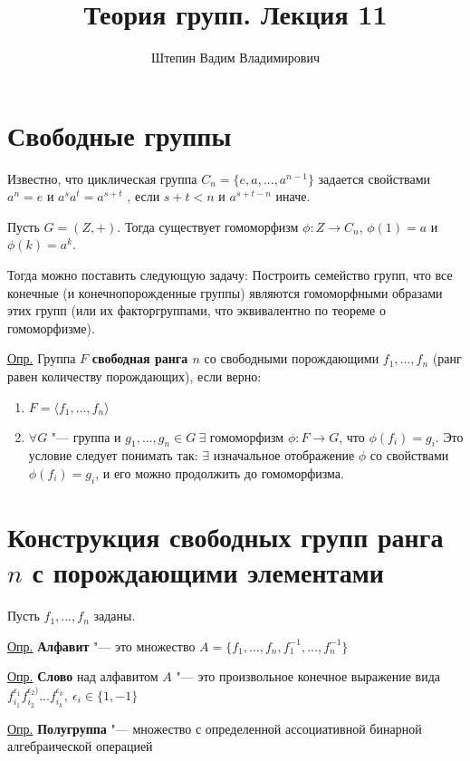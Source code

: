 \documentclass{article}
\title{Теория групп. Лекция 11}
\author{Штепин Вадим Владимирович}
\date{\DTMdate{2019-11-14}}
\begin{document}
\maketitle

\section{Свободные группы}

Известно, что циклическая группа $C_n = \{e, a, ..., a^{n-1}\}$ задается свойствами $a^n = e$ и $a^sa^t = a^{s + t}$ , если $s + t < n$ и $a^{s + t - n}$ иначе.

Пусть $G = (Z, +)$. Тогда существует гомоморфизм $\phi: Z \rightarrow C_n$, $\phi(1) = a$ и $\phi(k) = a^k$.

Тогда можно поставить следующую задачу: Построить семейство групп, что все конечные (и конечнопорожденные группы) являются гомоморфными образами этих групп (или их факторгруппами, что эквивалентно по теореме о гомоморфизме).

\vspace{10pt}

\underline{Опр.} Группа $F$ \textbf{свободная ранга $n$} со свободными порождающими $f_1, ..., f_n$ (ранг равен количеству порождающих), если верно:
\begin{enumerate}
	\item $F = \langle f_1, ..., f_n \rangle$
	\item $\forall G$ "--- группа и $g_1, ..., g_n \in G \  \exists$ гомоморфизм $\phi: F \rightarrow G$, что $\phi(f_i) = g_i$. Это условие следует понимать так: $\exists$ изначальное отображение $\phi$ со свойствами $\phi(f_i) = g_i$, и его можно продолжить до гомоморфизма. 
\end{enumerate} 

\section{Конструкция свободных групп ранга $n$ с порождающими элементами}

Пусть $f_1, ..., f_n$ заданы.

\underline{Опр.} \textbf{Алфавит} "--- это множество $A = \{f_1, ..., f_n, f_1^{-1}, ..., f_n^{-1}\}$

\underline{Опр.} \textbf{Слово} над алфавитом $A$ "--- это произвольное конечное выражение вида $f_{i_1}^{\epsilon_1}f_{i_2}^{\epsilon_2)}...f_{i_k}^{\epsilon_k}, \  \epsilon_i \in \{1, -1\}$

\underline{Опр.} \textbf{Полугруппа} "--- множество с определенной ассоциативной бинарной алгебраической операцией
\end{document}
